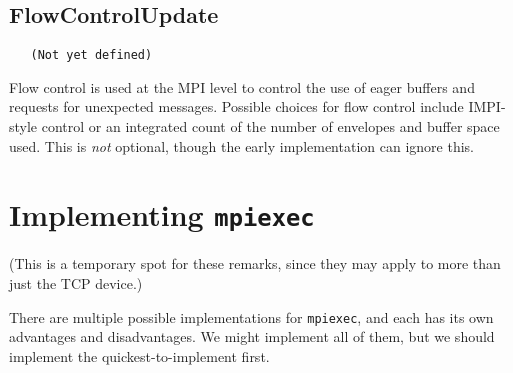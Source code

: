 \documentclass{article}
\def\code{\begingroup\makeustext\eatcode}
\def\eatcode#1{\texttt{#1}\endgroup}
\begin{document}
\subsection{FlowControlUpdate}
\begin{verbatim}
   (Not yet defined)
\end{verbatim}
Flow control is used at the MPI level to control the use of eager buffers and
requests for unexpected messages.  Possible choices for flow control include
IMPI-style control or an integrated count of the number of envelopes and
buffer space used.  This is \emph{not} optional, though the early
implementation can ignore this.

\section{Implementing \code{mpiexec}}
\label{sec:mpiexec}

(This is a temporary spot for these remarks, since they may apply to more than
just the TCP device.)

There are multiple possible implementations for \code{mpiexec}, and each has
its own advantages and disadvantages.  We might implement all of them, but we
should implement the quickest-to-implement first.
\end{document}
